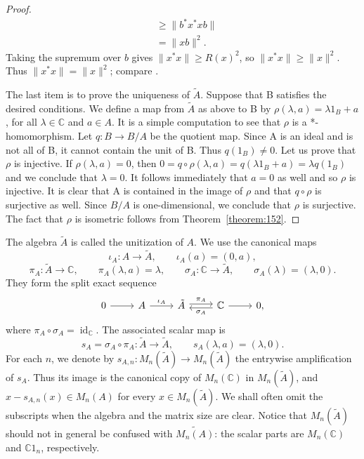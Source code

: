 \documentclass{book}
\begin{document}
\begin{proof}
\begin{align*}
    &\geq\|b^*x^*xb\|\\
    &=\|xb\|^2.
  \end{align*}
  Taking the supremum over \(b\) gives \(\|x^*x\|\geq R(x)^2\), so \(\|x^*x\|\geq\|x\|^2\). Thus \(\|x^*x\|=\|x\|^2\);
  compare \cite[Theorem 9.31 and Observation 9.32]{Marcoux2021}.\par
  The last item is to prove the uniqueness of \(\tilde{A}\). Suppose that B satisfies
  the desired conditions. We define a map from \(\tilde{A}\) as above to B by \(\rho(\lambda,a) =
  \lambda 1_B + a\), for all \(\lambda \in \mathbb{C}\) and \(a \in A\). It is a simple computation to see
  that \(\rho\) is a *-homomorphism. Let \(q : B \rightarrow B/A\) be the quotient map.
  Since A is an ideal and is not all of B, it cannot contain the unit of B.
  Thus \(q(1_B)\neq 0\). Let us prove that \(\rho\) is injective. If \(\rho(\lambda,a) = 0\), then
  \(0 = q\circ \rho(\lambda,a) = q(\lambda 1_B + a) = \lambda q(1_B)\) and we conclude that \(\lambda = 0\). It
  follows immediately that \(a = 0\) as well and so \(\rho\) is injective. It is clear that
  A is contained in the image of \(\rho\) and that \(q \circ \rho\) is surjective as well. Since
  \(B/A\) is one-dimensional, we conclude that \(\rho\) is surjective. The fact that \(\rho\) is
  isometric follows from Theorem~\ref{theorem:152}.
\end{proof}
The algebra \(\tilde{A}\) is called the \textnormal{unitization} of \(A\). We use the canonical maps
\[
  \iota_A:A\to\tilde{A},\qquad \iota_A(a)=(0,a),
\]
\[
  \pi_A:\tilde{A}\to\mathbb{C},\qquad \pi_A(\lambda,a)=\lambda,
  \qquad
  \sigma_A:\mathbb{C}\to\tilde{A},\qquad \sigma_A(\lambda)=(\lambda,0).
\]
They form the split exact sequence
\[
  \begin{tikzcd}
    0\arrow[r]&A\arrow[r,"\iota_A"]&\tilde{A}\arrow[r,shift left=2pt,"\pi_A"]
    &\mathbb{C}\arrow[l,shift left=2pt,"\sigma_A"]\arrow[r]&0,
  \end{tikzcd}
\]
where \(\pi_A\circ\sigma_A=\operatorname{id}_{\mathbb{C}}\). The associated
\textnormal{scalar map} is
\[
  s_A=\sigma_A\circ\pi_A:\tilde{A}\to\tilde{A},
  \qquad s_A(\lambda,a)=(\lambda,0).
\]
For each \(n\), we denote by \(s_{A,n}:M_n(\tilde{A})\to M_n(\tilde{A})\) the
entrywise amplification of \(s_A\). Thus its image is the canonical copy of
\(M_n(\mathbb{C})\) in \(M_n(\tilde{A})\), and
\(x-s_{A,n}(x)\in M_n(A)\) for every \(x\in M_n(\tilde{A})\). We shall often
omit the subscripts when the algebra and the matrix size are clear. Notice that
\(M_n(\tilde{A})\) should not in general be confused with
\(\widetilde{M_n(A)}\): the scalar parts are \(M_n(\mathbb{C})\) and
\(\mathbb{C}1_n\), respectively.\par
\end{document}
